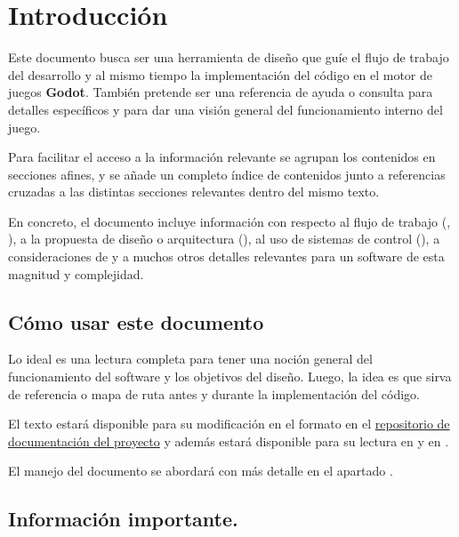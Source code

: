 
\section{Introducción}\label{intro:introduccion}

Este documento busca ser una herramienta de diseño que guíe el flujo de trabajo
del desarrollo y al mismo tiempo la implementación del código en el motor de
juegos \textbf{Godot}. También pretende ser una referencia de ayuda o consulta
para detalles específicos y para dar una visión general del funcionamiento
interno del juego.

Para facilitar el acceso a la información relevante se agrupan los contenidos
en secciones afines, y se añade un completo índice de contenidos junto a
referencias cruzadas a las distintas secciones relevantes dentro del mismo
texto.

En concreto, el documento incluye información con respecto al flujo de trabajo
(, ), a la
propuesta de diseño o arquitectura (),
al uso de sistemas de control  (), a
consideraciones de  y a muchos otros
detalles relevantes para un software de esta magnitud y complejidad.

\subsection{Cómo usar este documento}\label{intro:como-usar-el-documento}
Lo ideal es una lectura completa para tener una noción general del
funcionamiento del software y los objetivos del diseño. Luego, la idea es que
sirva de referencia o mapa de ruta antes y durante la implementación del
código.

El texto estará disponible para su modificación en el formato  en el
\href{https://github.com/polirritmico/Bakumapu-docs}{repositorio de
documentación del proyecto} y además estará disponible para su lectura en
\href{https://polirritmico.github.io/Bakumapu-docs/}{} y en
\href{https://github.com/polirritmico/Bakumapu-docs/blob/main/main.pdf}{}.

El manejo del documento se abordará con más detalle en el apartado
.

\subsection{Información importante.}
